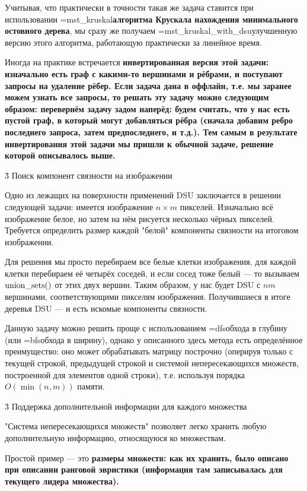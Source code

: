 Учитывая, что практически в точности такая же задача ставится при использовании \algohref=mst_kruskal{\bf{алгоритма Крускала нахождения минимального остовного дерева}}, мы сразу же получаем \algohref=mst_kruskal_with_dsu{улучшенную версию этого алгоритма}, работающую практически за линейное время.

Иногда на практике встречается \bf{инвертированная версия этой задачи}: изначально есть граф с какими-то вершинами и рёбрами, и поступают запросы на удаление рёбер. Если задача дана в оффлайн, т.е. мы заранее можем узнать все запросы, то решать эту задачу можно следующим образом: перевернём задачу задом наперёд: будем считать, что у нас есть пустой граф, в который могут добавляться рёбра (сначала добавим ребро последнего запроса, затем предпоследнего, и т.д.). Тем самым в результате инвертирования этой задачи мы пришли к обычной задаче, решение которой описывалось выше.



\h3{ Поиск компонент связности на изображении }

Одно из лежащих на поверхности применений DSU заключается в решении следующей задачи: имеется изображение $n \times m$ пикселей. Изначально всё изображение белое, но затем на нём рисуется несколько чёрных пикселей. Требуется определить размер каждой "белой" компоненты связности на итоговом изображении.

Для решения мы просто перебираем все белые клетки изображения, для каждой клетки перебираем её четырёх соседей, и если сосед тоже белый --- то вызываем ${\rm union\_sets}()$ от этих двух вершин. Таким образом, у нас будет DSU с $nm$ вершинами, соответствующими пикселям изображения. Получившиеся в итоге деревья DSU --- и есть искомые компоненты связности.

Данную задачу можно решить проще с использованием \algohref=dfs{обхода в глубину} (или \algohref=bfs{обхода в ширину}), однако у описанного здесь метода есть определённое преимущество: оно может обрабатывать матрицу построчно (оперируя только с текущей строкой, предыдущей строкой и системой непересекающихся множеств, построенной для элементов одной строки), т.е. используя порядка $O(\min (n, m))$ памяти.



\h3{ Поддержка дополнительной информации для каждого множества }

"Система непересекающихся множеств" позволяет легко хранить любую дополнительную информацию, относящуюся ко множествам.

Простой пример --- это \bf{размеры множеств}: как их хранить, было описано при описании ранговой эвристики (информация там записывалась для текущего лидера множества).

